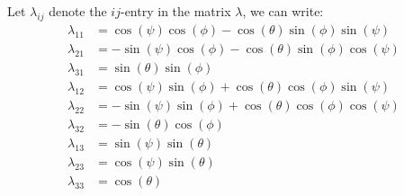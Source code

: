 \documentclass[11pt,oneside]{book}
\theoremstyle{break}
\theoremstyle{break}
\begin{document}
Let $\lambda_{ij}$ denote the $ij$-entry in the matrix $\lambda$, we can write:
\begin{align*}
\lambda_{11} &= \cos(\psi) \cos(\phi) - \cos(\theta) \sin(\phi) \sin(\psi)  \\
\lambda_{21} &= -\sin(\psi) \cos(\phi) - \cos(\theta) \sin(\phi) \cos(\psi) \\
\lambda_{31} &= \sin(\theta) \sin(\phi)\\
\lambda_{12} &= \cos(\psi)\sin(\phi) + \cos(\theta) \cos(\phi) \sin(\psi)\\
\lambda_{22} &= -\sin(\psi) \sin(\phi) +\cos(\theta) \cos(\phi) \cos(\psi)\\
\lambda_{32} &= -\sin(\theta) \cos(\phi)\\
\lambda_{13} &= \sin(\psi) \sin(\theta)\\
\lambda_{23} &= \cos(\psi) \sin(\theta) \\
\lambda_{33} &= \cos(\theta)
\end{align*}
\end{document}
